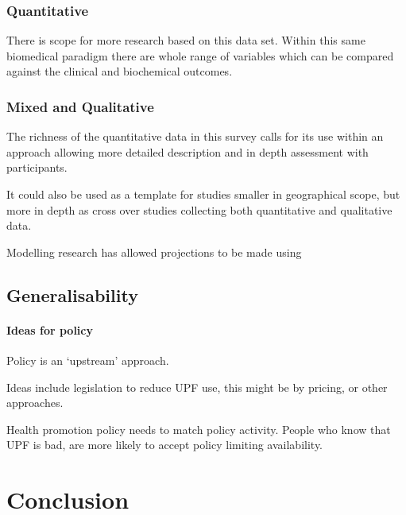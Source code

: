 \documentclass[
]{article}
\begin{document}
\hypertarget{quantitative}{%
\subsubsection{Quantitative}\label{quantitative}}

There is scope for more research based on this data set. Within this
same biomedical paradigm there are whole range of variables which can be
compared against the clinical and biochemical outcomes.

\hypertarget{mixed-and-qualitative}{%
\subsubsection{Mixed and Qualitative}\label{mixed-and-qualitative}}

The richness of the quantitative data in this survey calls for its use
within an approach allowing more detailed description and in depth
assessment with participants.

It could also be used as a template for studies smaller in geographical
scope, but more in depth as cross over studies collecting both
quantitative and qualitative data.

Modelling research has allowed projections to be made using

\hypertarget{generalisability}{%
\subsection{Generalisability}\label{generalisability}}

\hypertarget{ideas-for-policy}{%
\paragraph{Ideas for policy}\label{ideas-for-policy}}

Policy is an `upstream' approach.

Ideas include legislation to reduce UPF use, this might be by pricing,
or other approaches.

Health promotion policy needs to match policy activity. People who know
that UPF is bad, are more likely to accept policy limiting availability.

\newpage

\hypertarget{conclusion}{%
\section{Conclusion}\label{conclusion}}
\end{document}
